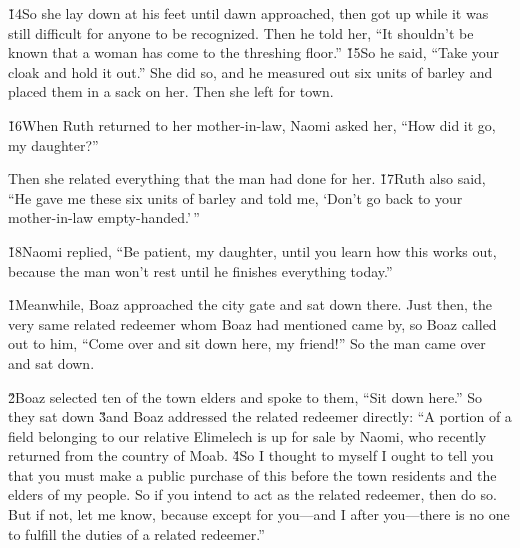 \v{14}So she lay down at his feet until dawn approached, then got up while it was still difficult for anyone to be recognized. Then he told her, ``It shouldn't be known that a woman has come to the threshing floor.'' \v{15}So he said, ``Take your cloak and hold it out.'' She did so, and he measured out six units of barley and placed them in a sack on her. Then she left for town.

\v{16}When Ruth returned to her mother-in-law, Naomi asked her, ``How did it go, my daughter?''

Then she related everything that the man had done for her. \v{17}Ruth also said, ``He gave me these six units of barley and told me, `Don't go back to your mother-in-law empty-handed.'\,''

\v{18}Naomi replied, ``Be patient, my daughter, until you learn how this works out, because the man won't rest until he finishes everything today.''

\v{1}Meanwhile, Boaz approached the city gate and sat down there. Just then, the very same related redeemer whom Boaz had mentioned came by, so Boaz called out to him, ``Come over and sit down here, my friend!'' So the man came over and sat down.

\v{2}Boaz selected ten of the town elders and spoke to them, ``Sit down here.'' So they sat down \v{3}and Boaz addressed the related redeemer directly: ``A portion of a field belonging to our relative Elimelech is up for sale by Naomi, who recently returned from the country of Moab. \v{4}So I thought to myself I ought to tell you that you must make a public purchase of this before the town residents and the elders of my people. So if you intend to act as the related redeemer, then do so. But if not, let me know, because except for you---and I after you---there is no one to fulfill the duties of a related redeemer.''

